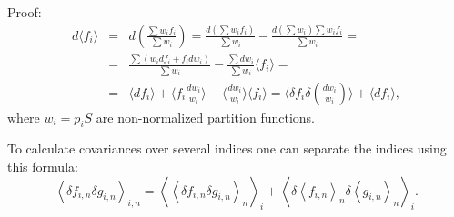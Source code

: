 Proof:
\begin{eqnarray}
\nonumber d \langle f_i \rangle &=&
d \left( \frac{\sum w_i f_i}{\sum w_i} \right) =
\frac{d(\sum w_i f_i)}{\sum w_i} - \frac{d(\sum w_i) \sum w_i f_i}{\sum w_i} = \\
\nonumber &=& \frac{\sum (w_i df_i + f_i dw_i)}{\sum w_i} - \frac{\sum dw_i}{\sum w_i} \langle f_i \rangle = \\
&=& \langle df_i \rangle + \langle f_i \frac{dw_i}{w_i} \rangle - \langle \frac{dw_i}{w_i} \rangle \langle f_i \rangle =
\langle \delta f_i \delta \left( \frac{dw_i}{w_i} \right) \rangle + \langle df_i \rangle,
\end{eqnarray}
where $w_i = p_i S$ are non-normalized partition functions.

To calculate covariances over several indices one can separate the indices using this formula:
\begin{equation}\label{sepcov}
\left\langle \delta f_{i,n} \delta g_{i,n} \right\rangle_{i,n} =
\left\langle \left\langle \delta f_{i,n} \delta g_{i,n} \right\rangle_n \right\rangle_i +
\left\langle \delta \left\langle f_{i,n} \right\rangle_n \delta \left\langle g_{i,n} \right\rangle_n \right\rangle_i.
\end{equation}

